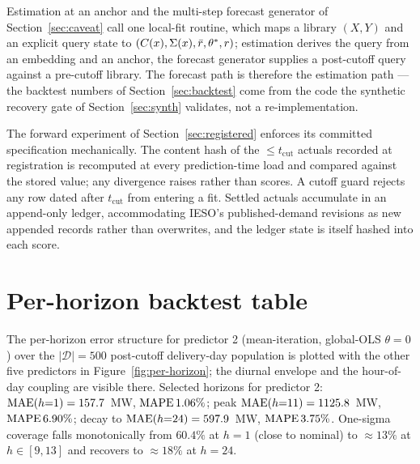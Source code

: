 Estimation at an anchor and the multi-step forecast generator of
Section~\ref{sec:caveat} call one local-fit routine, which maps a
library \((X, Y)\) and an explicit query state to
\((C(x), \Sigma(x), \bar r, \theta^{*}, r)\); estimation derives the query
from an embedding and an anchor, the forecast generator supplies a
post-cutoff query against a pre-cutoff library. The forecast path is
therefore the estimation path --- the backtest numbers of
Section~\ref{sec:backtest} come from the code the synthetic recovery
gate of Section~\ref{sec:synth} validates, not a re-implementation.

The forward experiment of Section~\ref{sec:registered} enforces its
committed specification mechanically. The content hash of the
\(\le t_{\mathrm{cut}}\) actuals recorded at registration is
recomputed at every prediction-time load and compared against the
stored value; any divergence raises rather than scores. A cutoff
guard rejects any row dated after \(t_{\mathrm{cut}}\) from entering
a fit. Settled actuals accumulate in an append-only ledger,
accommodating IESO's published-demand revisions as new appended
records rather than overwrites, and the ledger state is itself
hashed into each score.

\section{Per-horizon backtest table}
\label{app:backtest}

The per-horizon error structure for predictor 2 (mean-iteration,
global-OLS \(\theta = 0\)) over the \(|\mathcal{D}| = 500\)
post-cutoff delivery-day population is plotted with the other five
predictors in Figure~\ref{fig:per-horizon}; the diurnal envelope and
the hour-of-day coupling are visible there. Selected horizons for
predictor 2: \(\mathrm{MAE}(h{=}1) = 157.7\)~MW, \(\mathrm{MAPE}\,1.06\%\); peak
\(\mathrm{MAE}(h{=}11) = 1125.8\)~MW, \(\mathrm{MAPE}\,6.90\%\); decay to
\(\mathrm{MAE}(h{=}24) = 597.9\)~MW, \(\mathrm{MAPE}\,3.75\%\). One-sigma coverage
falls monotonically from \(60.4\%\) at \(h = 1\) (close to nominal)
to \(\approx 13\%\) at \(h \in [9, 13]\) and recovers to
\(\approx 18\%\) at \(h = 24\).

\ifstandalone


\fi
